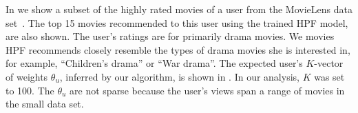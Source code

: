 In  we show a subset of the highly rated
movies of a user from the MovieLens data
set~\cite{Herlocker:1999}. The top 15 movies recommended to this user
using the trained HPF model, are also shown. The user's ratings are
for primarily drama movies. We movies HPF recommends closely resemble
the types of drama movies she is interested in, for example,
``Children's drama'' or ``War drama''. The expected user's $K$-vector
of weights $\theta_u$, inferred by our algorithm, is shown in
. In our analysis, $K$ was set to
100. The $\theta_u$ are not sparse because the user's views span a
range of movies in the small data set.






